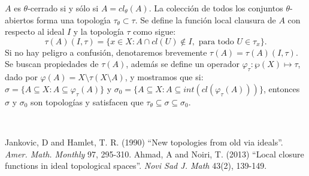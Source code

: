 \begin{titlepage}
\begin{minipage}{0.85\linewidth}
\begin{minipage}{0.85\linewidth}
\begin{resumen}
$A$ es $\theta$-cerrado si y s\'{o}lo si $A=cl_{\theta}(A)$. La colecci\'{o}n de todos los conjuntos $\theta$-abiertos forma una topolog\'{\i}a $\tau_{\theta}\subset \tau$. Se define la funci\'{o}n local clausura de $A$ con respecto al ideal $I$  y la topolog\'{i}a $\tau$ como sigue:
$$\tau(A)(I,\tau)=\{x\in X: A\cap cl(U)\notin I, \mbox{ para todo }U\in \tau_{x}\}.$$
Si no hay peligro a confusi\'{o}n, denotaremos brevemente $\tau(A)=\tau(A)(I,\tau)$. Se buscan propiedades de $\tau(A)$, adem\'{a}s se define un operador
$\varphi_{\tau}:\wp(X)\mapsto \tau$, dado por $\varphi(A)= X\setminus \tau(X\setminus A)$, y mostramos que si:\\
$\sigma= \{A\subseteq X: A\subseteq \varphi_{\tau}(A)\}$ y $\sigma_{0}= \{A\subseteq X: A\subseteq int(cl(\varphi_{\tau}(A)))\}$, entonces
$\sigma$ y $\sigma_{0}$ son topolog\'{i}as y satisfacen que $\tau_{\theta}\subseteq \sigma\subseteq \sigma_{0}$.
    \end{resumen}
   \end{minipage}
   \vspace{10pt}
\end{minipage}
\vspace{10pt}\\[5pt]
\begin{thebibliography}{99}
 {\sc Jankovic, D and Hamlet, T. R.} (1990) ``New topologies from old via ideals''. \emph{Amer. Math. Monthly} 97, 295-310.
 {\sc Ahmad, A and Noiri, T.} (2013) ``Local closure functions in ideal topological spaces''. \emph{Novi Sad J. Math} 43(2), 139-149.
\end{thebibliography}
\end{titlepage}


